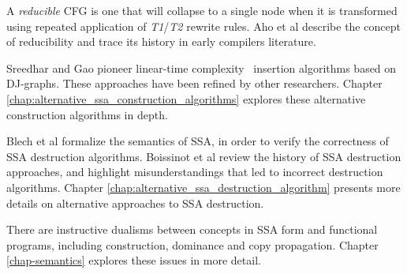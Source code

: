 A \textit{reducible} CFG is one that will collapse to a single node when 
it is transformed using repeated application of \emph{T1}/\emph{T2}
rewrite rules.
Aho et al \cite{aho86compilers} describe the concept of reducibility
and trace its history in early compilers literature.

Sreedhar and Gao \cite{sreedhar95linear} pioneer
linear-time complexity 
\phifun\ insertion
algorithms based on DJ-graphs.
These approaches have been refined by other researchers.
Chapter \ref{chap:alternative_ssa_construction_algorithms}
explores these alternative construction algorithms in depth.


Blech et al \cite{blech05optimizing}
formalize the semantics of SSA, in order to verify
the correctness of SSA destruction algorithms.
Boissinot et al \cite{boissinot09revisiting} review the history of SSA destruction approaches,
and highlight misunderstandings that led to incorrect destruction
algorithms.
Chapter \ref{chap:alternative_ssa_destruction_algorithm} presents
more details on alternative approaches to SSA destruction.

There are instructive dualisms between concepts in SSA form
and
functional programs, including construction, dominance and
copy propagation. Chapter \ref{chap-semantics} explores these issues
in more detail.



